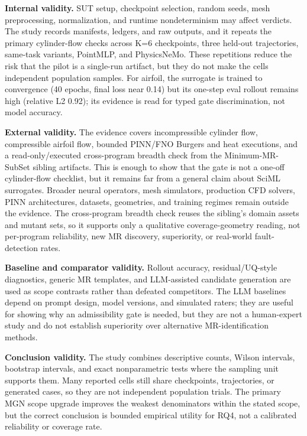 \documentclass[preprint,12pt]{elsarticle}
\begin{document}
\textbf{Internal validity.} SUT setup, checkpoint selection, random seeds, mesh preprocessing, normalization, and runtime nondeterminism may affect verdicts. The study records manifests, ledgers, and raw outputs, and it repeats the primary cylinder-flow checks across K=6 checkpoints, three held-out trajectories, same-task variants, PointMLP, and PhysicsNeMo. These repetitions reduce the risk that the pilot is a single-run artifact, but they do not make the cells independent population samples. For airfoil, the surrogate is trained to convergence (40 epochs, final loss near 0.14) but its one-step eval rollout remains high (relative L2 0.92); its evidence is read for typed gate discrimination, not model accuracy.

\textbf{External validity.} The evidence covers incompressible cylinder flow, compressible airfoil flow, bounded PINN/FNO Burgers and heat executions, and a read-only/executed cross-program breadth check from the Minimum-MR-SubSet sibling artifacts. This is enough to show that the gate is not a one-off cylinder-flow checklist, but it remains far from a general claim about SciML surrogates. Broader neural operators, mesh simulators, production CFD solvers, PINN architectures, datasets, geometries, and training regimes remain outside the evidence. The cross-program breadth check reuses the sibling's domain assets and mutant sets, so it supports only a qualitative coverage-geometry reading, not per-program reliability, new MR discovery, superiority, or real-world fault-detection rates.

\textbf{Baseline and comparator validity.} Rollout accuracy, residual/UQ-style diagnostics, generic MR templates, and LLM-assisted candidate generation are used as scope contrasts rather than defeated competitors. The LLM baselines depend on prompt design, model versions, and simulated raters; they are useful for showing why an admissibility gate is needed, but they are not a human-expert study and do not establish superiority over alternative MR-identification methods.

\textbf{Conclusion validity.} The study combines descriptive counts, Wilson intervals, bootstrap intervals, and exact nonparametric tests where the sampling unit supports them. Many reported cells still share checkpoints, trajectories, or generated cases, so they are not independent population trials. The primary MGN scope upgrade improves the weakest denominators within the stated scope, but the correct conclusion is bounded empirical utility for RQ4, not a calibrated reliability or coverage rate.
\end{document}
